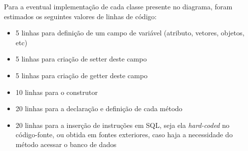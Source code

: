 \documentclass[
10pt, %
a4paper, %
oneside, %
headinclude,footinclude, %
BCOR5mm, %
]{scrartcl}
\begin{document}
Para a eventual implementação de cada classe presente no diagrama,
foram estimados os seguintes valores de linhas de código:
\begin{itemize}[noitemsep]
	\item 5 linhas para definição de um campo de variável (atributo,
		vetores, objetos, etc)
	\item 5 linhas para criação de setter deste campo
	\item 5 linhas para criação de getter deste campo
	\item 10 linhas para o construtor
	\item 20 linhas para a declaração e definição de cada método
	\item 20 linhas para a inserção de instruções em SQL, seja ela
		\textit{hard-coded} no código-fonte, ou obtida em fontes
		exteriores, caso haja a necessidade do método acessar o banco
		de dados
\end{itemize}
\end{document}
